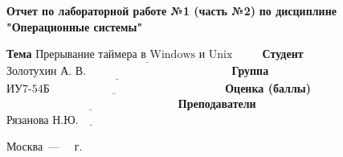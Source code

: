 \begin{titlepage}
	
	\begin{center}
		\Large\textbf{  Отчет по лабораторной работе №1 (часть №2)}\newline
		\textbf{по дисциплине "Операционные системы"}\newline\newline
	\end{center}
	
\noindent\textbf{Тема} $\underline{\text{Прерывание таймера в Windows и Unix~~~~~~~}}$\newline\newline
\noindent\textbf{Студент} $\underline{\text{Золотухин А. В.~~~~~~~~~~~~~~~~~~~~~~~~~~~~~~~~~~~~~~}}$\newline\newline
\noindent\textbf{Группа} $\underline{\text{ИУ7-54Б~~~~~~~~~~~~~~~~~~~~~~~~~~~~~~~~~~~~~~~~~~~~~~}}$\newline\newline
\noindent\textbf{Оценка (баллы)} $\underline{\text{~~~~~~~~~~~~~~~~~~~~~~~~~~~~~~~~~~~~~~~~~~~~~}}$\newline\newline
\noindent\textbf{Преподаватели} $\underline{\text{Рязанова Н.Ю.~~~~~~~~~~~~~~~~~~~~~~~~~~}}$\newline\newline\newline

	
	\begin{center}
		\vfill
		Москва~---~\the\year
		~г.
	\end{center}
	\restoregeometry
\end{titlepage}

